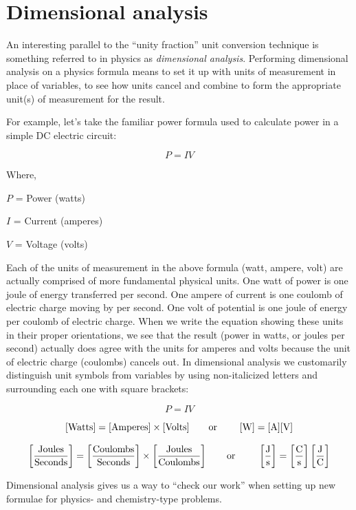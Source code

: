 \filbreak
\section{Dimensional analysis}

An interesting parallel to the ``unity fraction'' unit conversion technique is something referred to in physics as \textit{dimensional analysis}.  Performing dimensional analysis on a physics formula means to set it up with units of measurement in place of variables, to see how units cancel and combine to form the appropriate unit(s) of measurement for the result.  

For example, let's take the familiar power formula used to calculate power in a simple DC electric circuit:

$$P = IV$$

\noindent
Where,

$P$ = Power (watts)

$I$ = Current (amperes)

$V$ = Voltage (volts)

\vskip 10pt

Each of the units of measurement in the above formula (watt, ampere, volt) are actually comprised of more fundamental physical units.  One watt of power is one joule of energy transferred per second.  One ampere of current is one coulomb of electric charge moving by per second.  One volt of potential is one joule of energy per coulomb of electric charge.  When we write the equation showing these units in their proper orientations, we see that the result (power in watts, or joules per second) actually does agree with the units for amperes and volts because the unit of electric charge (coulombs) cancels out.  In dimensional analysis we customarily distinguish unit symbols from variables by using non-italicized letters and surrounding each one with square brackets:

$$P = IV$$

$$[\hbox{Watts}] = [\hbox{Amperes}] \times [\hbox{Volts}] \hbox{\hskip 20pt or \hskip 20pt} [\hbox{W}] = [\hbox{A}] [\hbox{V}]$$

$$\left[\hbox{Joules} \over \hbox{Seconds} \right] = \left[\hbox{Coulombs} \over \hbox{Seconds}\right] \times \left[\hbox{Joules} \over \hbox{Coulombs}\right] \hbox{\hskip 20pt or \hskip 20pt} \left[\hbox{J} \over \hbox{s} \right] = \left[\hbox{C} \over \hbox{s} \right] \left[\hbox{J} \over \hbox{C} \right]$$

Dimensional analysis gives us a way to ``check our work'' when setting up new formulae for physics- and chemistry-type problems.










